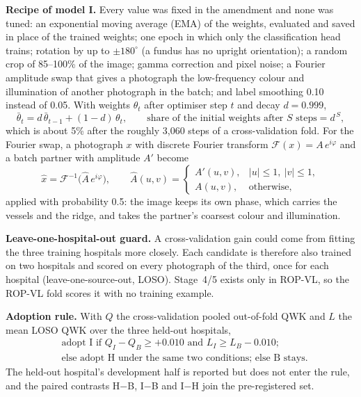 \textbf{Recipe of model I.} Every value was fixed in the amendment and none was tuned: an exponential moving average (EMA) of the weights, evaluated and saved in place of the trained weights; one epoch in which only the classification head trains; rotation by up to $\pm180^\circ$ (a fundus has no upright orientation); a random crop of 85--100\% of the image; gamma correction and pixel noise; a Fourier amplitude swap that gives a photograph the low-frequency colour and illumination of another photograph in the batch; and label smoothing 0.10 instead of 0.05. With weights $\theta_t$ after optimiser step $t$ and decay $d=0.999$,
\begin{equation}\label{eq:ema}
\bar\theta_t=d\,\bar\theta_{t-1}+(1-d)\,\theta_t,\qquad \text{share of the initial weights after }S\text{ steps}=d^{\,S},
\end{equation}
which is about 5\% after the roughly 3{,}060 steps of a cross-validation fold. For the Fourier swap, a photograph $x$ with discrete Fourier transform $\mathcal{F}(x)=A\,e^{i\varphi}$ and a batch partner with amplitude $A'$ become
\begin{equation}\label{eq:fourier}
\hat{x}=\mathcal{F}^{-1}\!\big(\hat{A}\,e^{i\varphi}\big),\qquad \hat{A}(u,v)=\begin{cases}A'(u,v), & |u|\le1,\ |v|\le1,\\ A(u,v), & \text{otherwise,}\end{cases}
\end{equation}
applied with probability 0.5: the image keeps its own phase, which carries the vessels and the ridge, and takes the partner's coarsest colour and illumination.

\textbf{Leave-one-hospital-out guard.} A cross-validation gain could come from fitting the three training hospitals more closely. Each candidate is therefore also trained on two hospitals and scored on every photograph of the third, once for each hospital (leave-one-source-out, LOSO). Stage~4/5 exists only in ROP-VL, so the ROP-VL fold scores it with no training example.

\textbf{Adoption rule.} With $Q$ the cross-validation pooled out-of-fold QWK and $L$ the mean LOSO QWK over the three held-out hospitals,
\begin{equation}\label{eq:adopt}
\begin{aligned}
&\text{adopt I if } Q_I-Q_B\ge+0.010 \text{ and } L_I\ge L_B-0.010;\\
&\text{else adopt H under the same two conditions; else B stays.}
\end{aligned}
\end{equation}
The held-out hospital's development half is reported but does not enter the rule, and the paired contrasts H$-$B, I$-$B and I$-$H join the pre-registered set.


